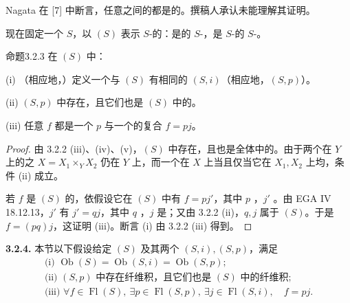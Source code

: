 Nagata 在 [7] 中断言，任意之间的都是的。撰稿人承认未能理解其证明。

现在固定一个 $S$，以 $(S)$ 表示 $S$-的：是的 $S$-，是 $S$-的 $S$-。
\begin{SGAresult}{命题}{3.2.3}
在 $(S)$ 中：

(i) （相应地，）定义一个与 $(S)$ 有相同的 $(S,i)$（相应地，$(S,p)$）。

(ii) $(S,p)$ 中存在，且它们也是 $(S)$ 中的。

(iii) 任意 $f$ 都是一个 $p$ 与一个的复合 $f=pj$。
\end{SGAresult}
\begin{proof}
由 3.2.2 (iii)、(iv)、(v)，$(S)$ 中存在，且也是全体中的。由于两个在 $Y$ 上的之 $X=X_1\times_Y X_2$ 仍在 $Y$ 上，而一个在 $X$ 上当且仅当它在 $X_1,X_2$ 上均，条件 (ii) 成立。

若 $f$ 是 $(S)$ 的，依假设它在 $(S)$ 中有 $f=pj'$，其中 $p$ ，$j'$ 。由 EGA IV 18.12.13，$j'$ 有 $j'=qj$，其中 $q$ ，$j$ 是；又由 3.2.2 (ii)，$q,j$ 属于 $(S)$。于是 $f=(pq)j$，这证明 (iii)。断言 (i) 由 3.2.2 (iii) 得到。
\end{proof}
\textbf{3.2.4.} 本节以下假设给定 $(S)$ 及其两个 $(S,i),(S,p)$，满足
\[
\begin{gathered}
\text{(i) }\operatorname{Ob}(S)=\operatorname{Ob}(S,i)=\operatorname{Ob}(S,p);\\
\text{(ii) }(S,p)\text{ 中存在纤维积，且它们也是 }(S)\text{ 中的纤维积};\\
\text{(iii) }\forall f\in\operatorname{Fl}(S),\ \exists p\in\operatorname{Fl}(S,p),\ \exists j\in\operatorname{Fl}(S,i),\quad f=pj.
\end{gathered}
\]
